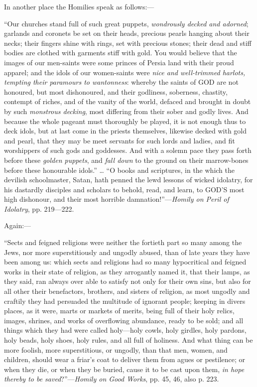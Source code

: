 In another place the Homilies speak as follows:—

``Our churches stand full of such great puppets,
\emph{wondrously decked and adorned}; garlands and coronets be set on
their heads, precious pearls hanging about their necks; their fingers
shine with rings, set with precious stones; their dead and stiff
bodies are clothed with garments stiff with gold. You would believe
that the images of our men-saints were some princes of Persia land
with their proud apparel; and the idols of our women-saints were \emph{nice
and well-trimmed harlots, tempting their paramours to wantonness}:
whereby the saints of GOD
are not honoured, but most dishonoured, and their godliness,
soberness, chastity, contempt of riches, and of the vanity of the
world, defaced and brought in doubt by such \emph{monstrous decking},
most differing from their sober and godly lives. And because the whole
pageant must thoroughly be played, it is not enough thus to deck
idols, but at last come in the priests themselves, likewise decked
with gold and pearl, that they may be meet servants for such lords and
ladies, and fit worshippers of such gods and goddesses. And with a
solemn pace they pass forth before these \emph{golden puppets}, and \emph{fall
down} to the ground on their marrow-bones before these honourable
idols.'' … ``O books and scriptures, in the which the
devilish schoolmaster, Satan, hath penned the lewd lessons of wicked
idolatry, for his dastardly disciples and scholars to behold, read,
and learn, to GOD'S most
high dishonour, and their most horrible damnation!''—\emph{Homily
on Peril of Idolatry}, pp. 219—222.

Again:—

``Sects and feigned religions were neither the
fortieth part so many among the Jews, nor more superstitiously and
ungodly abused, than of late years they have been among us: which
sects and religions had so many hypocritical and feigned works in
their state of religion, as they arrogantly named it, that their
lamps, as they said, ran always over able to satisfy not only for
their own sins, but also for all other their benefactors, brothers,
and sisters of religion, as most ungodly and craftily they had
persuaded the multitude of ignorant people; keeping in divers
places, as it were, marts or markets of merits, being full of their
holy relics, images, shrines, and works of overflowing abundance,
ready to be sold; and all things which they had were called holy—holy
cowls, holy girdles, holy pardons, holy beads, holy shoes, holy rules,
and all full of holiness. And what thing can be more foolish, more
superstitious, or ungodly, than that men, women, and children, should
wear a friar's coat to deliver them from agues or pestilence; or when
they die, or when they be buried, cause it to be cast upon them, \emph{in
hope thereby to be saved}?''—\emph{Homily on Good Works}, pp.
45, 46, also p. 223.

